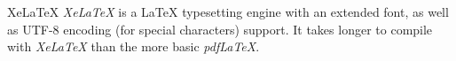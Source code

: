 \begin{definition}{XeLaTeX} \textit{XeLaTeX} is a LaTeX typesetting engine with an extended font, as well as UTF-8 encoding (for special characters) support. It takes longer to compile with \textit{XeLaTeX} than the more basic \textit{pdfLaTeX}.\end{definition}



